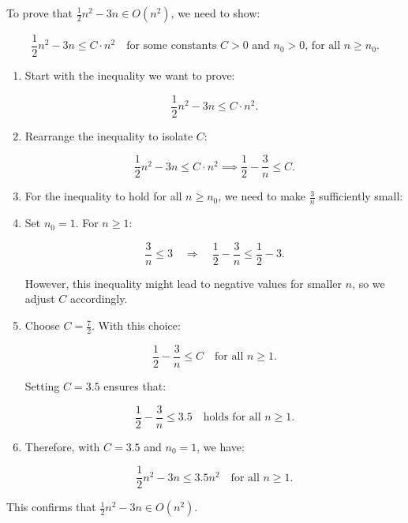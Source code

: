     \begin{example}
        To prove that \( \frac{1}{2}n^2 - 3n \in O(n^2) \), we need to show:

        \[
        \frac{1}{2}n^2 - 3n \leq C \cdot n^2 \quad \text{for some constants } C > 0 \text{ and } n_0 > 0 \text{, for all } n \geq n_0.
        \]

        \begin{enumerate}
            \item Start with the inequality we want to prove:
            
            \[
            \frac{1}{2}n^2 - 3n \leq C \cdot n^2.
            \]
            
            \item Rearrange the inequality to isolate \( C \):
            
            \[
            \frac{1}{2}n^2 - 3n \leq C \cdot n^2 \implies \frac{1}{2} - \frac{3}{n} \leq C.
            \]
            
            \item For the inequality to hold for all \( n \geq n_0 \), we need to make \( \frac{3}{n} \) sufficiently small:
            
            \item Set \( n_0 = 1 \). For \( n \geq 1 \):
            
            \[
            \frac{3}{n} \leq 3 \quad \Rightarrow \quad \frac{1}{2} - \frac{3}{n} \leq \frac{1}{2} - 3.
            \]
            
            However, this inequality might lead to negative values for smaller \( n \), so we adjust \( C \) accordingly.
            
            \item Choose \( C = \frac{7}{2} \). With this choice:
            
            \[
            \frac{1}{2} - \frac{3}{n} \leq C \quad \text{for all } n \geq 1.
            \]
            
            Setting \( C = 3.5 \) ensures that:
            
            \[
            \frac{1}{2} - \frac{3}{n} \leq 3.5 \quad \text{holds for all } n \geq 1.
            \]
            
            \item Therefore, with \( C = 3.5 \) and \( n_0 = 1 \), we have:
            
            \[
            \frac{1}{2}n^2 - 3n \leq 3.5n^2 \quad \text{for all } n \geq 1.
            \]
        \end{enumerate}

        This confirms that \( \frac{1}{2}n^2 - 3n \in O(n^2) \).
    \end{example}

